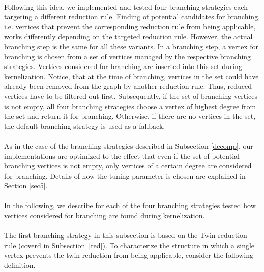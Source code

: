 \documentclass[]{article}
\begin{document}
\paragraph{}
Following this idea, we implemented and tested four branching strategies each targeting a different reduction rule. Finding of potential candidates for branching, i.e. vertices that prevent the corresponding reduction rule from being applicable, works differently depending on the targeted reduction rule. However, the actual branching step is the same for all these variants. In a branching step, a vertex for branching is chosen from a set of vertices managed by the respective branching strategies. Vertices considered for branching are inserted into this set during kernelization. Notice, that at the time of branching, vertices in the set could have already been removed from the graph by another reduction rule. Thus, reduced vertices have to be filtered out first. Subsequently, if the set of branching vertices is not empty, all four branching strategies choose a vertex of highest degree from the set and return it for branching. Otherwise, if there are no vertices in the set, the default branching strategy is used as a fallback.

\paragraph{}
As in the case of the branching strategies described in Subsection \ref{decomp}, our implementations are optimized to the effect that even if the set of potential branching vertices is not empty, only vertices of a certain degree are considered for branching. Details of how the tuning parameter is chosen are explained in Section \ref{sec5}.

\paragraph{}
In the following, we describe for each of the four branching strategies tested how vertices considered for branching are found during kernelization.

\paragraph{}
The first branching strategy in this subsection is based on the Twin reduction rule (coverd in Subsection~\ref{red}). To characterize the structure in which a single vertex prevents the twin reduction from being applicable, consider the following definition.
\end{document}
